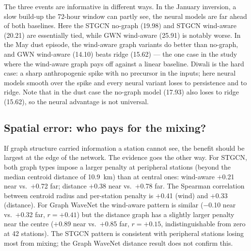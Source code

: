 \documentclass[11pt,a4paper]{article}
\begin{document}
\begin{table}[htbp]
\centering
\small
\caption{MAE during three real events ($\mu$g/m$^3$, network mean, 48-hour forecasts).}
\label{tab:cases}
\end{table}

The three events are informative in different ways.  In the January inversion,
a slow build-up the 72-hour window can partly see, the neural models are far
ahead of both baselines.  Here the STGCN no-graph (19.98) and STGCN wind-aware
(20.21) are essentially tied, while GWN wind-aware (25.91) is notably worse.
In the May dust episode, the wind-aware graph variants do better than no-graph,
and GWN wind-aware (14.10) beats ridge (15.62) --- the one case in the study
where the wind-aware graph pays off against a linear baseline.  Diwali is the
hard case: a sharp anthropogenic spike with no precursor in the inputs; here
neural models smooth over the spike and every neural variant loses to
persistence and to ridge.  Note that in the dust case the no-graph model
(17.93) also loses to ridge (15.62), so the neural advantage is not universal.

\subsection{Spatial error: who pays for the mixing?}

If graph structure carried information a station cannot see, the benefit should
be largest at the edge of the network.  The evidence goes the other way.
For STGCN, both graph types impose a larger penalty at peripheral stations
(beyond the median centroid distance of 10.9~km) than at central ones:
wind-aware $+$0.21 near vs.\ $+$0.72 far; distance $+$0.38 near vs.\ $+$0.78
far.  The Spearman correlation between centroid radius and per-station penalty
is $+$0.41 (wind) and $+$0.33 (distance).  For Graph WaveNet the wind-aware
pattern is similar ($-$0.10 near vs.\ $+$0.32 far, $r=+0.41$) but the
distance graph has a slightly larger penalty near the centre ($+$0.89 near
vs.\ $+$0.85 far, $r=+0.15$, indistinguishable from zero at 42 stations).
The STGCN pattern is consistent with peripheral stations losing most from
mixing; the Graph WaveNet distance result does not confirm this.
\end{document}
